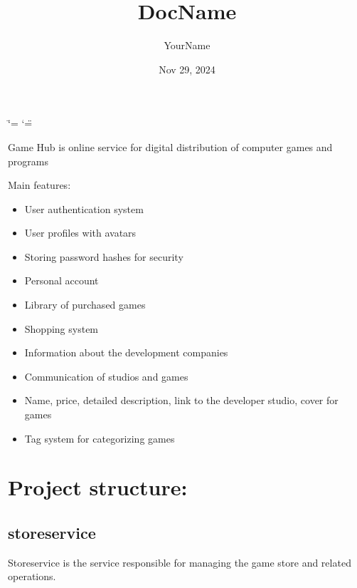 \documentclass[letterpaper,10pt,english]{sphinxmanual}
\title{DocName}
\date{Nov 29, 2024}
\author{YourName}
\begin{document}
\ifdefined\shorthandoff
  \ifnum\catcode`\=\string=\active\shorthandoff{=}\fi
  \ifnum\catcode`\"=\active{}\fi
\fi

\pagestyle{empty}
\sphinxmaketitle
\pagestyle{plain}
\sphinxtableofcontents
\pagestyle{normal}
\label{\detokenize{index::doc}}


\sphinxAtStartPar
Game Hub is online service for digital distribution of computer games and programs

\sphinxAtStartPar
Main features:
\begin{itemize}
\item {} 
\sphinxAtStartPar
User authentication system

\item {} 
\sphinxAtStartPar
User profiles with avatars

\item {} 
\sphinxAtStartPar
Storing password hashes for security

\item {} 
\sphinxAtStartPar
Personal account

\item {} 
\sphinxAtStartPar
Library of purchased games

\item {} 
\sphinxAtStartPar
Shopping system

\item {} 
\sphinxAtStartPar
Information about the development companies

\item {} 
\sphinxAtStartPar
Communication of studios and games

\item {} 
\sphinxAtStartPar
Name, price, detailed description, link to the developer studio, cover for games

\item {} 
\sphinxAtStartPar
Tag system for categorizing games

\end{itemize}


\chapter{Project structure:}
\label{\detokenize{index:project-structure}}
\sphinxstepscope


\section{store\sphinxhyphen{}service}
\label{\detokenize{store-service:store-service}}\label{\detokenize{store-service::doc}}
\sphinxAtStartPar
Store\sphinxhyphen{}service is the service responsible for managing the game store and related operations.
\end{document}
